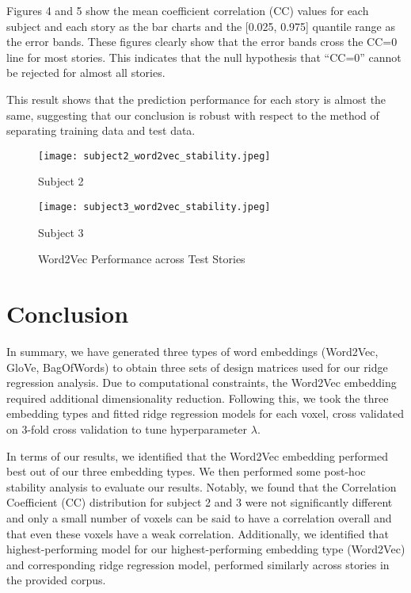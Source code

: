 \documentclass[12pt,letterpaper]{article}
\begin{document}
Figures 4 and 5 show the mean coefficient correlation (CC) values for each subject and each story as the bar charts and the [0.025, 0.975] quantile range as the error bands. These figures clearly show that the error bands cross the CC=0 line for most stories. This indicates that the null hypothesis that “CC=0” cannot be rejected for almost all stories.

This result shows that the prediction performance for each story is almost the same, suggesting that our conclusion is robust with respect to the method of separating training data and test data.

\begin{figure}[H]
    \centering
    \begin{minipage}{0.45\textwidth}
        \centering
        \texttt{[image: subject2\_word2vec\_stability.jpeg]}
        \caption{Subject 2}
        \label{fig:word2vec_subject2_stability}
    \end{minipage}
    \hfill
    \begin{minipage}{0.45\textwidth}
        \centering
        \texttt{[image: subject3\_word2vec\_stability.jpeg]}
        \caption{Subject 3}
        \label{fig:word2vec_subject3_stability}
    \end{minipage}
    \caption{Word2Vec Performance across Test Stories}
    \label{fig:word2vec_stability}
\end{figure}


\section{Conclusion}
In summary, we have generated three types of word embeddings (Word2Vec, GloVe, BagOfWords) to obtain three sets of design matrices used for our ridge regression analysis. Due to computational constraints, the Word2Vec embedding required additional dimensionality reduction. Following this, we took the three embedding types and fitted ridge regression models for each voxel, cross validated on 3-fold cross validation to tune hyperparameter $\lambda$. 

In terms of our results, we identified that the Word2Vec embedding performed best out of our three embedding types. We then performed some post-hoc stability analysis to evaluate our results. Notably, we found that the Correlation Coefficient (CC) distribution for subject 2 and 3 were not significantly different and only a small number of voxels can be said to have a correlation overall and that even these voxels have a weak correlation. Additionally, we identified that highest-performing model for our highest-performing embedding type (Word2Vec) and corresponding ridge regression model, performed similarly across stories in the provided corpus.
\end{document}
